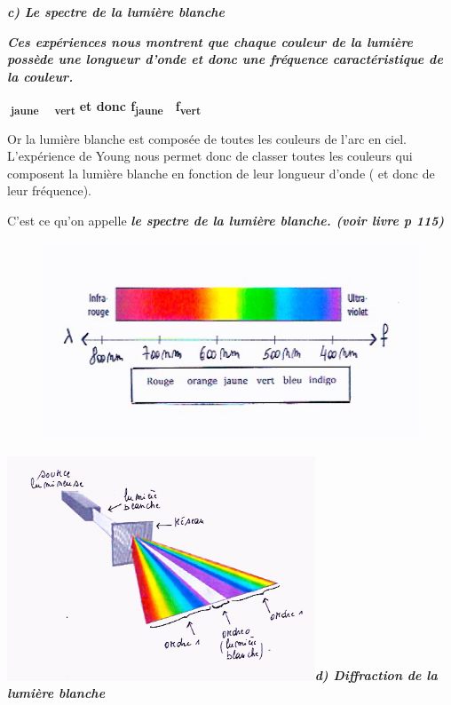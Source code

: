 \emph{\textbf{c) Le spectre de la lumière blanche}}

\emph{\textbf{Ces expériences nous montrent que chaque couleur de la
lumière possède une longueur d'onde et donc une fréquence
caractéristique de la couleur. }}

\textbf{}\textsubscript{\textbf{jaune}}\textbf{ 
}\textsubscript{\textbf{vert}}\textbf{ et donc
f}\textsubscript{\textbf{jaune}}\textbf{ 
f}\textsubscript{\textbf{vert}}

Or la lumière blanche est composée de toutes les couleurs de l'arc en
ciel. L'expérience de Young nous permet donc de classer toutes les
couleurs qui composent la lumière blanche en fonction de leur longueur
d'onde ( et donc de leur fréquence).

C'est ce qu'on appelle \emph{\textbf{le spectre de la lumière blanche.
(voir livre p 115)}}

\begin{figure}
\centering
\includegraphics[width=11.557cm,height=5.907cm]{Pictures/1000000100000186000000C7B42157D8D8096212.png}
\caption{}
\end{figure}

\includegraphics[width=9.176cm,height=6.676cm]{Pictures/10000001000001FB0000017167AEF9D1A02E0A78.png}\emph{\textbf{d)
Diffraction de la lumière blanche}}

